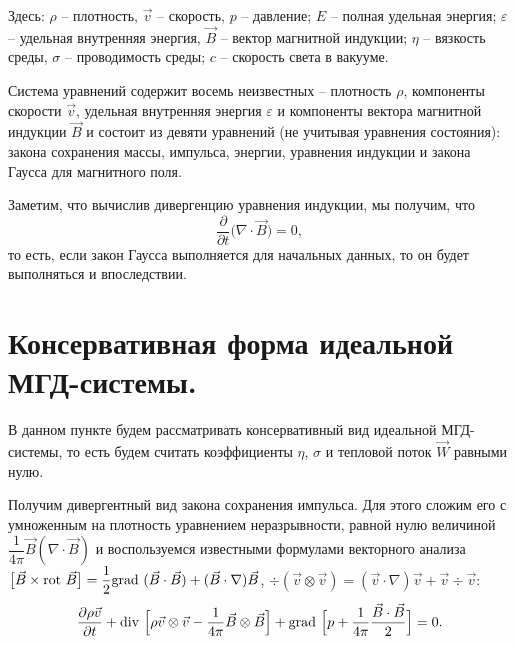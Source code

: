 \documentclass[14pt, a4paper, fleqn]{extreport}
\begin{document}
	Здесь:
	$\rho$ -- плотность, $\vec{v}$ -- скорость, $p$ -- давление;
	$E$ -- полная удельная энергия; $\varepsilon$ -- удельная внутренняя энергия, 
	$\vec{B}$ -- вектор магнитной индукции;
	$\eta$ -- вязкость среды, $\sigma$ -- проводимость среды;
	$c$ -- скорость света в вакууме.
	
	Система уравнений содержит восемь неизвестных -- плотность $\rho$,
	компоненты скорости $\vec{v}$, удельная внутренняя энергия $\varepsilon$
	и компоненты вектора магнитной индукции $\vec{B}$
	и состоит из девяти уравнений (не учитывая уравнения состояния):
	закона сохранения массы, импульса, энергии, уравнения индукции 
	и закона Гаусса для магнитного поля.
	
	Заметим, что вычислив дивергенцию уравнения индукции, мы получим, что
	\begin{equation*}
		\dfrac{\partial}{\partial t} \big( \nabla \cdot \vec{B} \big) = 0,
	\end{equation*}
	то есть, если закон Гаусса выполняется для начальных данных, то
	он будет выполняться и впоследствии.

	\section{Консервативная форма идеальной \\
		     МГД-системы.}

	В данном пункте будем рассматривать консервативный вид идеальной
	МГД-системы, то есть будем считать коэффициенты $\eta$, $\sigma$ 
	и тепловой поток $\vec{W}$ равными нулю.
	
	Получим дивергентный вид закона сохранения импульса. 
	Для этого сложим его с умноженным на плотность уравнением неразрывности,
	равной нулю величиной $\dfrac{1}{4\pi}\vec{B}(\nabla\cdot\vec{B})$
	и воспользуемся известными формулами векторного анализа 
	$\big[ \vec{B} \times \text{rot }{\vec{B}} \big] = 
		\dfrac{1}{2}\text{grad }{(\vec{B} \cdot \vec{B})} + (\vec{B} \cdot \nabla)\vec{B}$,
	$\div{(\vec{v}\otimes\vec{v})} = (\vec{v} \cdot \nabla)\vec{v} + \vec{v}\div{\vec{v}}$:
	\begin{equation*}
		\dfrac{\partial\rho\vec{v}}{\partial t}
			+ \text{div }{\Big[ \rho\vec{v}\otimes\vec{v} - \dfrac{1}{4\pi}\vec{B}\otimes\vec{B} \Big]}
			+ \text{grad }{\Big[ p + \dfrac{1}{4\pi}\dfrac{\vec{B}\cdot\vec{B}}{2} \Big]} = 0.
	\end{equation*}
	
\end{document}
